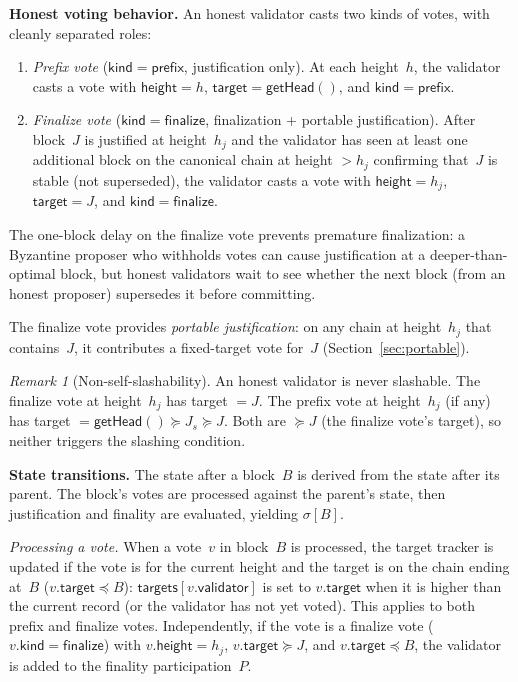 \ifx\litemode\undefined\documentclass{article}\fi
\renewcommand{\paragraph}[1]{\vspace{7pt}\noindent\textbf{#1}}
\newcommand{\target}{\mathsf{target}}
\newcommand{\targets}{\mathsf{targets}}
\newcommand{\kind}{\mathsf{kind}}
\newcommand{\height}{\mathsf{height}}
\newcommand{\finalize}{\mathsf{finalize}}
\newcommand{\validator}{\mathsf{validator}}
\newcommand{\prefix}{\mathsf{prefix}}
\theoremstyle{plain}
\theoremstyle{definition}
\theoremstyle{remark}
\newtheorem{remark}[theorem]{Remark}
\begin{document}
\paragraph{Honest voting behavior.}
An honest validator casts two kinds of votes, with cleanly separated roles:
\begin{enumerate}
  \item \emph{Prefix vote} ($\kind = \prefix$, justification only).
        At each height~$h$, the validator casts a vote with $\height = h$, $\target = \textsf{getHead}()$, and $\kind = \prefix$.
  \item \emph{Finalize vote} ($\kind = \finalize$, finalization + portable justification).
        After block~$J$ is justified at height~$h_j$ and the validator has seen at least one additional block on the canonical chain at height $> h_j$ confirming that~$J$ is stable (not superseded), the validator casts a vote with $\height = h_j$, $\target = J$, and $\kind = \finalize$.
\end{enumerate}
The one-block delay on the finalize vote prevents premature finalization: a Byzantine proposer who withholds votes can cause justification at a deeper-than-optimal block, but honest validators wait to see whether the next block (from an honest proposer) supersedes it before committing.

The finalize vote provides \emph{portable justification}: on any chain at height~$h_j$ that contains~$J$, it contributes a fixed-target vote for~$J$ (Section~\ref{sec:portable}).

\begin{remark}[Non-self-slashability]\label{rem:nonslash}
An honest validator is never slashable.
The finalize vote at height~$h_j$ has target $= J$.
The prefix vote at height~$h_j$ (if any) has target $= \textsf{getHead}() \succeq J_s \succeq J$.
Both are $\succeq J$ (the finalize vote's target), so neither triggers the slashing condition.
\end{remark}

\paragraph{State transitions.}
The state after a block~$B$ is derived from the state after its parent.
The block's votes are processed against the parent's state, then justification and finality are evaluated, yielding $\sigma[B]$.

\emph{Processing a vote.}
When a vote~$v$ in block~$B$ is processed, the target tracker is updated if the vote is for the current height and the target is on the chain ending at~$B$ ($v.\target \preceq B$): $\targets[v.\validator]$ is set to $v.\target$ when it is higher than the current record (or the validator has not yet voted).
This applies to both prefix and finalize votes.
Independently, if the vote is a finalize vote ($v.\kind = \finalize$) with $v.\height = h_j$, $v.\target \succeq J$, and $v.\target \preceq B$, the validator is added to the finality participation~$P$.
\end{document}
